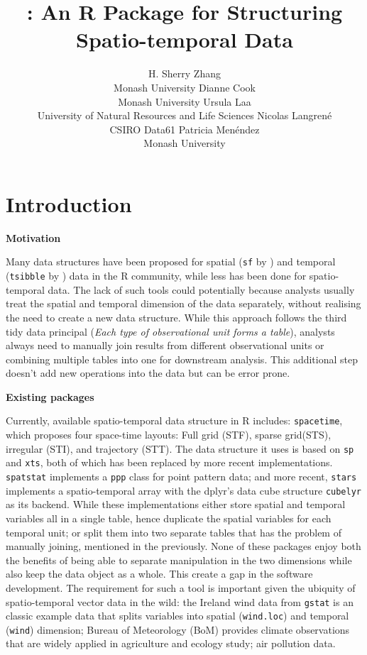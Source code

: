 \documentclass[
]{jss}
\author{
H. Sherry Zhang\\Monash University \And Dianne Cook\\Monash University
\AND Ursula Laa\\University of Natural Resources and Life Sciences
\AND Nicolas Langrené\\CSIRO Data61 \AND Patricia
Menéndez\\Monash University \AND
}
\title{\pkg{cubble}: An R Package for Structuring Spatio-temporal Data}
\begin{document}
\newpage

\hypertarget{introduction}{%
\section{Introduction}\label{introduction}}

\textbf{Motivation}

Many data structures have been proposed for spatial (\texttt{sf} by
\citet{sf}) and temporal (\texttt{tsibble} by \citet{tsibble}) data in
the R community, while less has been done for spatio-temporal data. The
lack of such tools could potentially because analysts usually treat the
spatial and temporal dimension of the data separately, without realising
the need to create a new data structure. While this approach follows the
third tidy data principal \citep{tidydata} (\emph{Each type of
observational unit forms a table}), analysts always need to manually
join results from different observational units or combining multiple
tables into one for downstream analysis. This additional step doesn't
add new operations into the data but can be error prone. \newline

\textbf{Existing packages}

Currently, available spatio-temporal data structure in R includes:
\texttt{spacetime}\citep{spacetime}, which proposes four space-time
layouts: Full grid (STF), sparse grid(STS), irregular (STI), and
trajectory (STT). The data structure it uses is based on \texttt{sp}
\citep{sp} and \texttt{xts}\citep{xts}, both of which has been replaced
by more recent implementations. \texttt{spatstat} \citep{spatstat}
implements a \texttt{ppp} class for point pattern data; and more recent,
\texttt{stars} \citep{stars} implements a spatio-temporal array with the
dplyr's data cube structure \texttt{cubelyr} \citep{cubelyr} as its
backend. While these implementations either store spatial and temporal
variables all in a single table, hence duplicate the spatial variables
for each temporal unit; or split them into two separate tables that has
the problem of manually joining, mentioned in the previously. None of
these packages enjoy both the benefits of being able to separate
manipulation in the two dimensions while also keep the data object as a
whole. This create a gap in the software development. The requirement
for such a tool is important given the ubiquity of spatio-temporal
vector data in the wild: the Ireland wind data from \texttt{gstat} is an
classic example data that splits variables into spatial
(\texttt{wind.loc}) and temporal (\texttt{wind}) dimension; Bureau of
Meteorology (BoM) provides climate observations that are widely applied
in agriculture and ecology study; air pollution data. \newline
\end{document}
